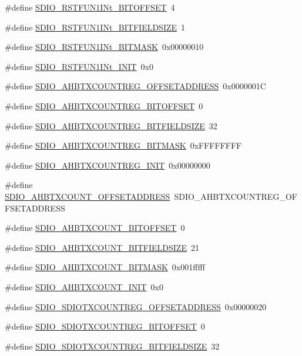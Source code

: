 \begin{DoxyCompactItemize}
\item 
\#define \hyperlink{a00571_a4d8e14de2893c2efc408a42317ac65d6}{SDIO\_\-RSTFUN1INt\_\-BITOFFSET}~4
\item 
\#define \hyperlink{a00571_ac4dd9bf39e5e5c19847234bebbcf7d49}{SDIO\_\-RSTFUN1INt\_\-BITFIELDSIZE}~1
\item 
\#define \hyperlink{a00571_a32fcc5fec5ae163c84c206f93b4305c1}{SDIO\_\-RSTFUN1INt\_\-BITMASK}~0x00000010
\item 
\#define \hyperlink{a00571_a2c7fb4525414d393d581c8f1bd257c21}{SDIO\_\-RSTFUN1INt\_\-INIT}~0x0
\item 
\#define \hyperlink{a00571_a107ec0d3ae7dfb11897412e26777bdb9}{SDIO\_\-AHBTXCOUNTREG\_\-OFFSETADDRESS}~0x0000001C
\item 
\#define \hyperlink{a00571_a70705c30a91b0b6681d544f4ba56235e}{SDIO\_\-AHBTXCOUNTREG\_\-BITOFFSET}~0
\item 
\#define \hyperlink{a00571_aa14c1d5f0fcdc76a0c431e74a2edbde7}{SDIO\_\-AHBTXCOUNTREG\_\-BITFIELDSIZE}~32
\item 
\#define \hyperlink{a00571_a4b3c0600288b50c380ab5f13f0fc541d}{SDIO\_\-AHBTXCOUNTREG\_\-BITMASK}~0xFFFFFFFF
\item 
\#define \hyperlink{a00571_a7bfe22639ca899f48ca98eebc9c2908c}{SDIO\_\-AHBTXCOUNTREG\_\-INIT}~0x00000000
\item 
\#define \hyperlink{a00571_af438c90a95ab102c5dee0c1097293190}{SDIO\_\-AHBTXCOUNT\_\-OFFSETADDRESS}~SDIO\_\-AHBTXCOUNTREG\_\-OFFSETADDRESS
\item 
\#define \hyperlink{a00571_a55d397e4d114950b49c3be95f776e947}{SDIO\_\-AHBTXCOUNT\_\-BITOFFSET}~0
\item 
\#define \hyperlink{a00571_a259b8c92977865873d9f45de30f3ed9a}{SDIO\_\-AHBTXCOUNT\_\-BITFIELDSIZE}~21
\item 
\#define \hyperlink{a00571_a689b5d0e933120d5778de9f2e61816df}{SDIO\_\-AHBTXCOUNT\_\-BITMASK}~0x001fffff
\item 
\#define \hyperlink{a00571_a3b5d3e659fba9e60abdfc7dbb35a8200}{SDIO\_\-AHBTXCOUNT\_\-INIT}~0x0
\item 
\#define \hyperlink{a00571_a66e5512cc2f11961bf67b87827d0c48d}{SDIO\_\-SDIOTXCOUNTREG\_\-OFFSETADDRESS}~0x00000020
\item 
\#define \hyperlink{a00571_a0a300f249a89f6647b870c3b9c039825}{SDIO\_\-SDIOTXCOUNTREG\_\-BITOFFSET}~0
\item 
\#define \hyperlink{a00571_a61d87fe9631a61d2069e4dbcb342eee8}{SDIO\_\-SDIOTXCOUNTREG\_\-BITFIELDSIZE}~32
\item 

\end{DoxyCompactItemize}
